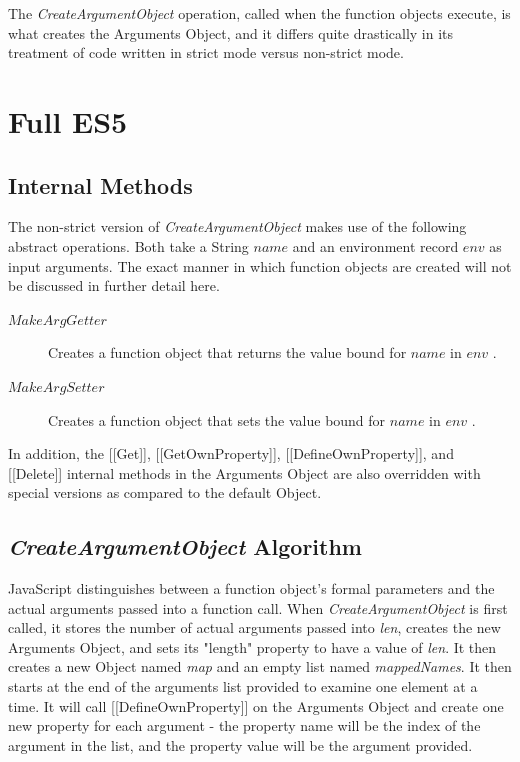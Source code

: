 \documentclass[a4paper,11pt,twoside]{report}
\begin{document}
The \textit{CreateArgumentObject} operation, called when the function objects execute, is what creates the Arguments Object, and it differs quite drastically in its treatment of code written in strict mode versus non-strict mode. 

\section{Full ES5}
\subsection{Internal Methods}\label{sec:argobjIM}
The non-strict version of \textit{CreateArgumentObject} makes use of the following abstract operations. Both take a String $name$ and an environment record $env$ as input arguments. The exact manner in which function objects are created will not be discussed in further detail here.
\begin{description}
\item[$MakeArgGetter$] Creates a function object that returns the value bound for $name$ in $env$ \cite{EcmaScript}.
\item[$MakeArgSetter$] Creates a function object that sets the value bound for $name$ in $env$ \cite{EcmaScript}.
\end{description}

In addition, the [[Get]], [[GetOwnProperty]], [[DefineOwnProperty]], and [[Delete]] internal methods in the Arguments Object are also overridden with special versions as compared to the default Object.

\subsection{\textit{CreateArgumentObject} Algorithm}
JavaScript distinguishes between a function object's formal parameters and the actual arguments passed into a function call. When \textit{CreateArgumentObject} is first called, it stores the number of actual arguments passed into \textit{len}, creates the new Arguments Object, and sets its "length" property to have a value of \textit{len}. It then creates a new Object named \textit{map} and an empty list named \textit{mappedNames}. It then starts at the end of the arguments list provided to examine one element at a time. It will call [[DefineOwnProperty]] on the Arguments Object and create one new property for each argument - the property name will be the index of the argument in the list, and the property value will be the argument provided. 
\end{document}
